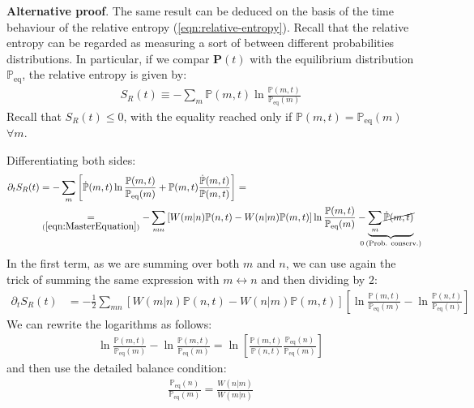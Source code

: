 \documentclass[../../main.tex]{subfiles}
\begin{document}
\textbf{Alternative proof}. The same result can be deduced on the basis of the time behaviour of the relative entropy (\ref{eqn:relative-entropy}). Recall that the relative entropy can be regarded as measuring a sort of  between different probabilities distributions. In particular, if we compar $\bm{P}(t)$ with the equilibrium distribution $\mathbb{P}_{\mathrm{eq}}$, the relative entropy is given by:
\begin{align*}
    S_R(t) \equiv - \sum_m \mathbb{P}(m,t) \ln \frac{\mathbb{P}(m,t)}{\mathbb{P}_{\mathrm{eq}}(m)} 
\end{align*} 
Recall that $S_R(t) \leq 0$, with the equality reached only if $\mathbb{P}(m,t) = \mathbb{P}_{\mathrm{eq}}(m)$ $\forall m$.

\medskip

Differentiating both sides:
\begin{align*}
    \partial_t S_R(t) &= -\sum_m \left[\dot{\mathbb{P}}(m,t) \ln \frac{\mathbb{P}(m,t)}{\mathbb{P}_{\mathrm{eq}}(m)} + \mathbb{P}(m,t) \frac{\dot{\mathbb{P}}(m,t)}{\mathbb{P}(m,t)} \right] =\\
    &\underset{(\ref{eqn:MasterEquation})}{=}  -\sum_{mn} \left[W(m|n) \mathbb{P}(n,t) - W(n|m)\mathbb{P}(m,t)\right] \ln \frac{\mathbb{P}(m,t)}{\mathbb{P}_{\mathrm{eq}}(m)} - \underbrace{\sum_m \cancel{\dot{\mathbb{P}}(m,t)}}_{\mathclap{0 \> (\text{Prob. conserv.})}} 
\end{align*}
In the first term, as we are summing over both $m$ and $n$, we can use again the trick of summing the same expression with $m \leftrightarrow n$ and then dividing by $2$:
\begin{align*}
    \partial_t S_R(t) &= -\frac{1}{2} \sum_{mn} \left[W(m|n)\mathbb{P}(n,t) - W(n|m) \mathbb{P}(m,t)\right] \left[\ln \frac{\mathbb{P}(m,t)}{\mathbb{P}_{\mathrm{eq}}(m)} - \ln \frac{\mathbb{P}(n,t)}{\mathbb{P}_{\mathrm{eq}}(n)}  \right]
\end{align*}
We can rewrite the logarithms as follows:
\begin{align*}
    \ln \frac{\mathbb{P}(m,t)}{\mathbb{P}_{\mathrm{eq}}(m)} - \ln \frac{\mathbb{P}(m,t)}{\mathbb{P}_{\mathrm{eq}}(m)} = \ln \left[\frac{\mathbb{P}(m,t)}{\mathbb{P}(n,t)} \frac{\mathbb{P}_{\mathrm{eq}}(n)}{\mathbb{P}_{\mathrm{eq}}(m)} \right]
\end{align*}
and then use the detailed balance condition:
\begin{align*}
    \frac{\mathbb{P}_{\mathrm{eq}}(n)}{\mathbb{P}_{\mathrm{eq}}(m)}  = \frac{W(n|m)}{W(m|n)} 
\end{align*}
\end{document}
